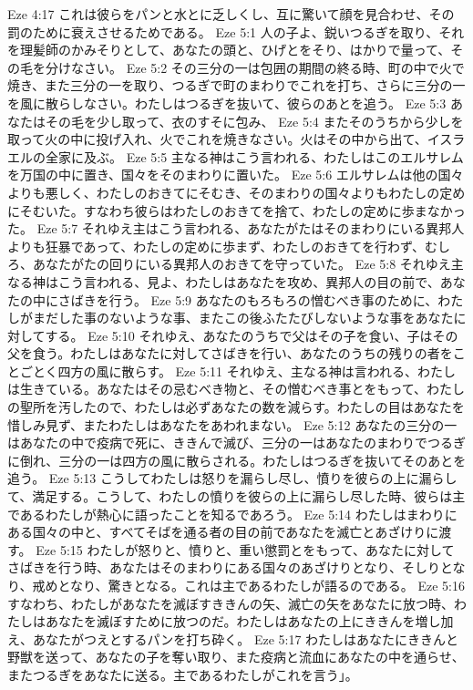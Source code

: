 Eze 4:17  これは彼らをパンと水とに乏しくし、互に驚いて顔を見合わせ、その罰のために衰えさせるためである。
Eze 5:1  人の子よ、鋭いつるぎを取り、それを理髪師のかみそりとして、あなたの頭と、ひげとをそり、はかりで量って、その毛を分けなさい。
Eze 5:2  その三分の一は包囲の期間の終る時、町の中で火で焼き、また三分の一を取り、つるぎで町のまわりでこれを打ち、さらに三分の一を風に散らしなさい。わたしはつるぎを抜いて、彼らのあとを追う。
Eze 5:3  あなたはその毛を少し取って、衣のすそに包み、
Eze 5:4  またそのうちから少しを取って火の中に投げ入れ、火でこれを焼きなさい。火はその中から出て、イスラエルの全家に及ぶ。
Eze 5:5  主なる神はこう言われる、わたしはこのエルサレムを万国の中に置き、国々をそのまわりに置いた。
Eze 5:6  エルサレムは他の国々よりも悪しく、わたしのおきてにそむき、そのまわりの国々よりもわたしの定めにそむいた。すなわち彼らはわたしのおきてを捨て、わたしの定めに歩まなかった。
Eze 5:7  それゆえ主はこう言われる、あなたがたはそのまわりにいる異邦人よりも狂暴であって、わたしの定めに歩まず、わたしのおきてを行わず、むしろ、あなたがたの回りにいる異邦人のおきてを守っていた。
Eze 5:8  それゆえ主なる神はこう言われる、見よ、わたしはあなたを攻め、異邦人の目の前で、あなたの中にさばきを行う。
Eze 5:9  あなたのもろもろの憎むべき事のために、わたしがまだした事のないような事、またこの後ふたたびしないような事をあなたに対してする。
Eze 5:10  それゆえ、あなたのうちで父はその子を食い、子はその父を食う。わたしはあなたに対してさばきを行い、あなたのうちの残りの者をことごとく四方の風に散らす。
Eze 5:11  それゆえ、主なる神は言われる、わたしは生きている。あなたはその忌むべき物と、その憎むべき事とをもって、わたしの聖所を汚したので、わたしは必ずあなたの数を減らす。わたしの目はあなたを惜しみ見ず、またわたしはあなたをあわれまない。
Eze 5:12  あなたの三分の一はあなたの中で疫病で死に、ききんで滅び、三分の一はあなたのまわりでつるぎに倒れ、三分の一は四方の風に散らされる。わたしはつるぎを抜いてそのあとを追う。
Eze 5:13  こうしてわたしは怒りを漏らし尽し、憤りを彼らの上に漏らして、満足する。こうして、わたしの憤りを彼らの上に漏らし尽した時、彼らは主であるわたしが熱心に語ったことを知るであろう。
Eze 5:14  わたしはまわりにある国々の中と、すべてそばを通る者の目の前であなたを滅亡とあざけりに渡す。
Eze 5:15  わたしが怒りと、憤りと、重い懲罰とをもって、あなたに対してさばきを行う時、あなたはそのまわりにある国々のあざけりとなり、そしりとなり、戒めとなり、驚きとなる。これは主であるわたしが語るのである。
Eze 5:16  すなわち、わたしがあなたを滅ぼすききんの矢、滅亡の矢をあなたに放つ時、わたしはあなたを滅ぼすために放つのだ。わたしはあなたの上にききんを増し加え、あなたがつえとするパンを打ち砕く。
Eze 5:17  わたしはあなたにききんと野獣を送って、あなたの子を奪い取り、また疫病と流血にあなたの中を通らせ、またつるぎをあなたに送る。主であるわたしがこれを言う」。
